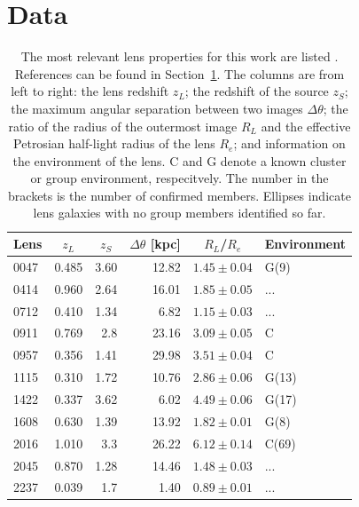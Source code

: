 \documentclass[useAMS,usenatbib]{mn2e}
\begin{document}
\section{Data}\label{sec:data}
\begin{table}
  \begin{center}
    \begin{tabular}{l r r r r l}
      Lens & \multicolumn{1}{c}{$z_{L}$} & \multicolumn{1}{c}{$z_{S}$} & \multicolumn{1}{c}{$\Delta\theta$ [kpc]} & \multicolumn{1}{c}{$R_{L}$/$R_{e}$} & Environment \\ \hline
      0047 & 0.485 & 3.60 & 12.82 & $1.45\pm0.04$ & G(9) \\
      0414 & 0.960 & 2.64 & 16.01 & $1.85\pm0.05$ & ... \\
      0712 & 0.410 & 1.34 & 6.82  & $1.15\pm0.03$ & ... \\
      0911 & 0.769 & 2.8  & 23.16 & $3.09\pm0.05$ & C \\
      0957 & 0.356 & 1.41 & 29.98 & $3.51\pm0.04$ & C \\
      1115 & 0.310 & 1.72 & 10.76 & $2.86\pm0.06$ & G(13) \\
      1422 & 0.337 & 3.62 & 6.02  & $4.49\pm0.06$ & G(17) \\
      1608 & 0.630 & 1.39 & 13.92 & $1.82\pm0.01$ & G(8) \\
      2016 & 1.010 & 3.3  & 26.22 & $6.12\pm0.14$ & C(69) \\
      2045 & 0.870 & 1.28 & 14.46 & $1.48\pm0.03$ & ... \\
      2237 & 0.039 & 1.7  & 1.40  & $0.89\pm0.01$ & ... \\
    \end{tabular}
    \caption[width=\linewidth]{The most relevant lens properties for this work are listed \citep[for an expanded version of this table see][]{2011ApJ...740...97L}. References can be found in Section~\ref{sec:data}. The columns are from left to right: the lens redshift $z_L$; the redshift of the source $z_S$; the maximum angular separation between two images $\Delta\theta$; the ratio of the radius of the outermost image $R_L$ and the effective Petrosian half-light radius of the lens $R_e$; and information on the environment of the lens. C and G denote a known cluster or group environment, respecitvely. The number in the brackets is the number of confirmed members. Ellipses indicate lens galaxies with no group members identified so far.}
    \label{tab:lensproperties}
  \end{center}
\end{table}
\end{document}
